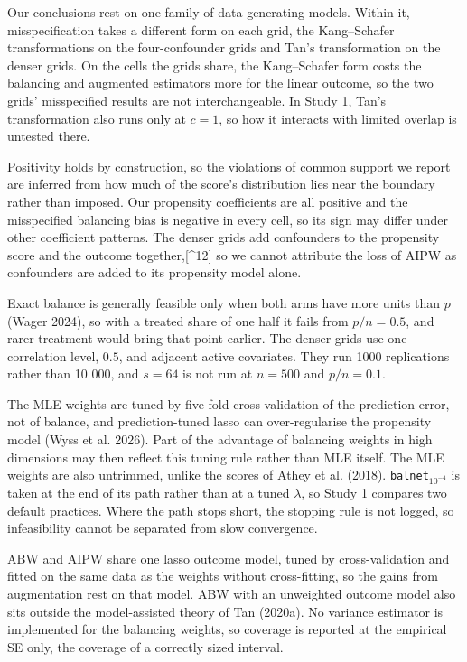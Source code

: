 \documentclass[
  12pt,
  a4paper,
]{article}
\begin{document}
Our conclusions rest on one family of data-generating models. Within it,
misspecification takes a different form on each grid, the Kang--Schafer
transformations on the four-confounder grids and Tan's transformation on
the denser grids. On the cells the grids share, the Kang--Schafer form
costs the balancing and augmented estimators more for the linear
outcome, so the two grids' misspecified results are not interchangeable.
In Study 1, Tan's transformation also runs only at \(c = 1\), so how it
interacts with limited overlap is untested there.

Positivity holds by construction, so the violations of common support we
report are inferred from how much of the score's distribution lies near
the boundary rather than imposed. Our propensity coefficients are all
positive and the misspecified balancing bias is negative in every cell,
so its sign may differ under other coefficient patterns. The denser
grids add confounders to the propensity score and the outcome
together,{[}\^{}12{]} so we cannot attribute the loss of AIPW as
confounders are added to its propensity model alone.

Exact balance is generally feasible only when both arms have more units
than \(p\) (Wager 2024), so with a treated share of one half it fails
from \(p/n = 0.5\), and rarer treatment would bring that point earlier.
The denser grids use one correlation level, \(0.5\), and adjacent active
covariates. They run 1000 replications rather than 10 000, and
\(s = 64\) is not run at \(n = 500\) and \(p/n = 0.1\).

The MLE weights are tuned by five-fold cross-validation of the
prediction error, not of balance, and prediction-tuned lasso can
over-regularise the propensity model ({Wyss et al.} 2026). Part of the
advantage of balancing weights in high dimensions may then reflect this
tuning rule rather than MLE itself. The MLE weights are also untrimmed,
unlike the scores of Athey et al. (2018). \texttt{balnet}\(_{10^{-4}}\)
is taken at the end of its path rather than at a tuned \(\lambda\), so
Study 1 compares two default practices. Where the path stops short, the
stopping rule is not logged, so infeasibility cannot be separated from
slow convergence.

ABW and AIPW share one lasso outcome model, tuned by cross-validation
and fitted on the same data as the weights without cross-fitting, so the
gains from augmentation rest on that model. ABW with an unweighted
outcome model also sits outside the model-assisted theory of Tan
(2020a). No variance estimator is implemented for the balancing weights,
so coverage is reported at the empirical SE only, the coverage of a
correctly sized interval.
\end{document}
